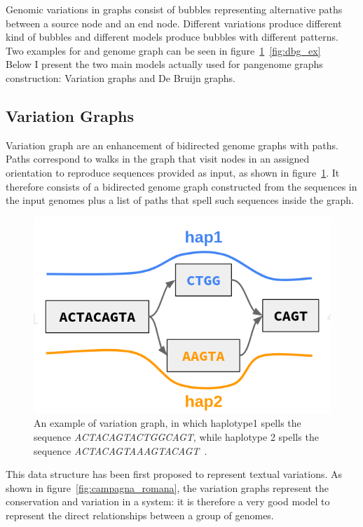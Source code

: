 Genomic variations in graphs consist of bubbles representing alternative paths between a source node and an end node. Different variations produce different kind of bubbles and different models produce bubbles with different patterns. Two examples for \dbg and genome graph can be seen in figure~\ref{fig:vg_example}~\ref{fig:dbg_ex}\\
Below I present the two main models actually used for pangenome graphs construction: Variation graphs and De Bruijn graphs.

\subsection{Variation Graphs}
Variation graph are an enhancement of bidirected genome graphs with paths. Paths correspond to walks in the graph that visit nodes in an assigned orientation to reproduce sequences provided as input, as shown in figure~\ref{fig:vg_example}. It therefore consists of a bidirected genome graph constructed from the sequences in the input genomes plus a list of paths that spell such sequences inside the graph.
\begin{figure}[h!]
	\centering
	\includegraphics[width=.65\linewidth]{figures/background/vg.png}
	\caption[The Variation Graph model.]{An example of variation graph, in which haplotype1 spells the sequence \emph{ACTACAGTACTGGCAGT}, while haplotype 2 spells the sequence \emph{ACTACAGTAAAGTACAGT}~\cite{garrison_pangenome}.}
	\label{fig:vg_example}
\end{figure}
This data structure has been first proposed to represent textual variations. As shown in figure~\ref{fig:campagna_romana}, the variation graphs represent the conservation and variation in a system: it is therefore a very good model to represent the direct relationships between a group of genomes.
